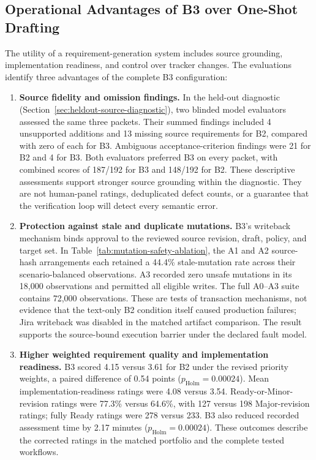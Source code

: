 \documentclass[manuscript,review]{acmart}
\begin{document}
\subsection{Operational Advantages of B3 over One-Shot Drafting}
The utility of a requirement-generation system includes source grounding, implementation readiness, and control over tracker changes. The evaluations identify three advantages of the complete B3 configuration:
\begin{enumerate}
  \item \textbf{Source fidelity and omission findings.} In the held-out diagnostic (Section~\ref{sec:heldout-source-diagnostic}), two blinded model evaluators assessed the same three packets. Their summed findings included 4 unsupported additions and 13 missing source requirements for B2, compared with zero of each for B3. Ambiguous acceptance-criterion findings were 21 for B2 and 4 for B3. Both evaluators preferred B3 on every packet, with combined scores of 187/192 for B3 and 148/192 for B2. These descriptive assessments support stronger source grounding within the diagnostic. They are not human-panel ratings, deduplicated defect counts, or a guarantee that the verification loop will detect every semantic error.
  \item \textbf{Protection against stale and duplicate mutations.} B3's writeback mechanism binds approval to the reviewed source revision, draft, policy, and target set. In Table~\ref{tab:mutation-safety-ablation}, the A1 and A2 source-hash arrangements each retained a 44.4\% stale-mutation rate across their scenario-balanced observations. A3 recorded zero unsafe mutations in its 18,000 observations and permitted all eligible writes. The full A0--A3 suite contains 72,000 observations. These are tests of transaction mechanisms, not evidence that the text-only B2 condition itself caused production failures; Jira writeback was disabled in the matched artifact comparison. The result supports the source-bound execution barrier under the declared fault model.
  \item \textbf{Higher weighted requirement quality and implementation readiness.} B3 scored 4.15 versus 3.61 for B2 under the revised priority weights, a paired difference of 0.54 points ($p_{\mathrm{Holm}}=0.00024$). Mean implementation-readiness ratings were 4.08 versus 3.54. Ready-or-Minor-revision ratings were 77.3\% versus 64.6\%, with 127 versus 198 Major-revision ratings; fully Ready ratings were 278 versus 233. B3 also reduced recorded assessment time by 2.17 minutes ($p_{\mathrm{Holm}}=0.00024$). These outcomes describe the corrected ratings in the matched portfolio and the complete tested workflows.
\end{enumerate}
\end{document}
